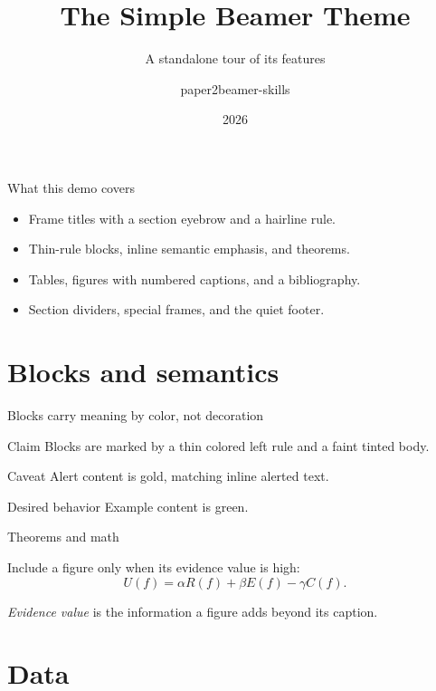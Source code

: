 \documentclass[aspectratio=169]{beamer}
\title[Simple theme]{The Simple Beamer Theme}
\subtitle{A standalone tour of its features}
\author{paper2beamer-skills}
\institute{Self-contained demo deck}
\date{2026}
\begin{document}
\titleframe

\begin{frame}{What this demo covers}
  \begin{itemize}
    \item Frame titles with a section eyebrow and a hairline rule.
    \item Thin-rule blocks, inline \alert{semantic emphasis}, and theorems.
    \item Tables, figures with numbered captions, and a bibliography.
    \item Section dividers, special frames, and the quiet footer.
  \end{itemize}
\end{frame}

\section{Blocks and semantics}

\begin{frame}{Blocks carry meaning by color, not decoration}
  \begin{block}{Claim}
    Blocks are marked by a thin colored left rule and a faint tinted body.
  \end{block}
  \begin{alertblock}{Caveat}
    Alert content is gold, matching inline \alert{alerted text}.
  \end{alertblock}
  \begin{exampleblock}{Desired behavior}
    Example content is green.
  \end{exampleblock}
\end{frame}

\begin{frame}{Theorems and math}
  \begin{theorem}
    Include a figure only when its evidence value is high:
    \[ U(f) = \alpha R(f) + \beta E(f) - \gamma C(f). \]
  \end{theorem}
  \begin{definition}
    \emph{Evidence value} is the information a figure adds beyond its caption.
  \end{definition}
\end{frame}

\section{Data}
\end{document}
